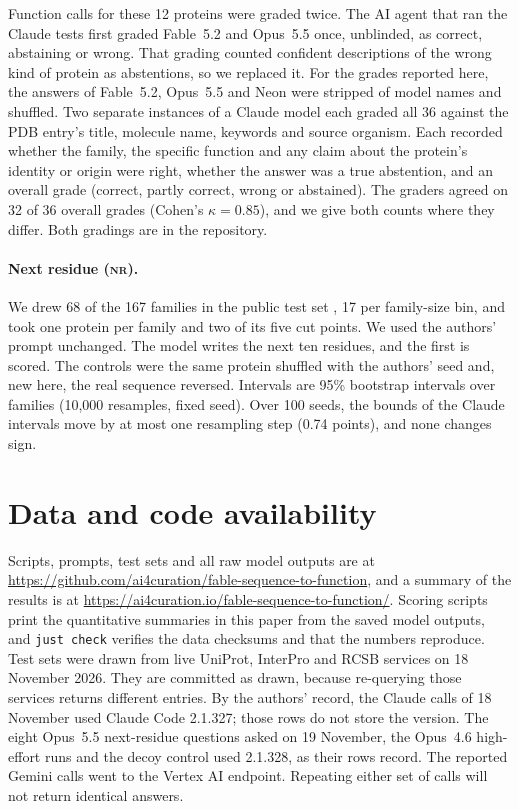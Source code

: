 \documentclass[11pt]{article}
\newcommand{\tnr}{\textmd{\textsc{nr}}}\newcommand{\tfeat}{\textmd{\textsc{feat}}}
\begin{document}
Function calls for these 12 proteins were graded twice. The AI agent that ran the Claude tests first
graded Fable~5.2 and Opus~5.5 once, unblinded, as correct, abstaining or wrong. That grading counted
confident descriptions of the wrong kind of protein as abstentions, so we replaced it. For the grades
reported here, the answers of Fable~5.2, Opus~5.5 and Neon were stripped of model names and shuffled. Two
separate instances of a Claude model each graded all 36 against the PDB entry's title, molecule name,
keywords and source organism.
Each recorded whether the family, the specific function and any claim about the protein's identity or
origin were right, whether the answer was a true abstention, and an overall grade (correct, partly
correct, wrong or abstained). The graders agreed on 32 of 36 overall grades (Cohen's $\kappa = 0.85$), and
we give both counts where they differ. Both gradings are in the repository.

\paragraph{Next residue (\tnr).} We drew 68 of the 167 families in the public test set
\citep{tu2026probe}, 17 per family-size bin, and took one protein per family and two of its five cut
points. We used the authors' prompt unchanged. The model writes the next ten residues, and the first is
scored. The controls were the same protein shuffled with the authors' seed and, new here, the real
sequence reversed. Intervals are 95\% bootstrap intervals over families (10,000 resamples, fixed seed). Over
100 seeds, the bounds of the Claude intervals move by at most one resampling step (0.74 points), and none
changes sign.

\section*{Data and code availability}

Scripts, prompts, test sets and all raw model outputs are at
\url{https://github.com/ai4curation/fable-sequence-to-function}, and a summary of the results is at
\url{https://ai4curation.io/fable-sequence-to-function/}. Scoring scripts print the quantitative
summaries in this paper from the saved model outputs, and \texttt{just check} verifies the data checksums
and that the numbers reproduce. Test sets were drawn from live UniProt, InterPro and RCSB services on 18
November 2026. They are committed as drawn, because re-querying those services returns different entries.
By the authors' record, the Claude calls of 18 November used Claude Code 2.1.327; those rows do not store
the version. The eight Opus~5.5 next-residue questions asked on 19 November, the Opus~4.6 high-effort
runs and the decoy control used 2.1.328, as their rows record. The reported Gemini calls went to the
Vertex AI endpoint. Repeating either set of calls will not return identical answers.
\end{document}
